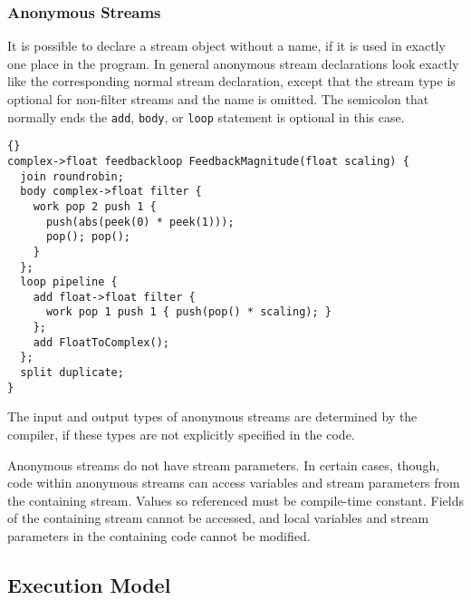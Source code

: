 \documentclass[11pt]{article}
\newcommand{\new}{\marginpar{\footnotesize \textbf{~~--~New~--}}}
\begin{document}

\subsubsection{Anonymous Streams}
\label{sec:anonymous-streams}

It is possible to declare a stream object without a name, if it is
used in exactly one place in the program.  In general anonymous stream
declarations look exactly like the corresponding normal stream
declaration, except that the stream type is optional for non-filter
streams and the name is omitted.  The semicolon that normally ends the
\lstinline|add|, \lstinline|body|, or \lstinline|loop| statement is
optional in this case.

\enlargethispage{\baselineskip}
\begin{lstlisting}{}
complex->float feedbackloop FeedbackMagnitude(float scaling) {
  join roundrobin;
  body complex->float filter {
    work pop 2 push 1 {
      push(abs(peek(0) * peek(1)));
      pop(); pop();
    }
  };
  loop pipeline {
    add float->float filter {
      work pop 1 push 1 { push(pop() * scaling); }
    };
    add FloatToComplex();
  };
  split duplicate;
}
\end{lstlisting}

The input and output types of anonymous streams are determined by the
compiler, if these types are not explicitly specified in the code.

Anonymous streams do not have stream parameters.  In certain cases,
though, code within anonymous streams can access variables and stream
parameters from the containing stream.  Values so referenced must be
compile-time constant.  Fields of the containing stream cannot be
accessed, and local variables and stream parameters in the containing
code cannot be modified.

\subsection{Execution Model}
\end{document}

